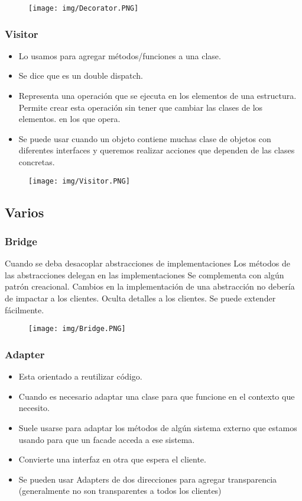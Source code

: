\begin{figure}[!htb]
    \centering
    \texttt{[image: img/Decorator.PNG]}
\end{figure}

\subsubsection*{Visitor}
\begin{itemize}
\item Lo usamos para agregar métodos/funciones a una clase.
\item Se dice que es un double dispatch.
\item Representa una operación que se ejecuta en los elementos de una estructura. Permite crear esta operación sin tener que cambiar las clases de los elementos. en los que opera.
\item Se puede usar cuando un objeto contiene muchas clase de objetos con diferentes interfaces y queremos realizar acciones que dependen de las clases concretas.
\end{itemize}


\begin{figure}[!htb]
    \centering
    \texttt{[image: img/Visitor.PNG]}
\end{figure}

\subsection*{Varios}

\subsubsection*{Bridge}
Cuando se deba desacoplar abstracciones de implementaciones
Los métodos de las abstracciones delegan en las implementaciones
Se complementa con algún patrón creacional.
Cambios en la implementación de una abstracción no debería de impactar a los clientes.
Oculta detalles a los clientes.
Se puede extender fácilmente.

\begin{figure}[!htb]
    \centering
    \texttt{[image: img/Bridge.PNG]}
\end{figure}

\subsubsection*{Adapter}
\begin{itemize}
\item Esta orientado a reutilizar código.
\item Cuando es necesario adaptar una clase para que funcione en el contexto que necesito.
\item Suele usarse para adaptar los métodos de algún sistema externo que estamos usando para que un facade acceda a ese sistema.
\item Convierte una interfaz en otra que espera el cliente.
\item Se pueden usar Adapters de dos direcciones para agregar transparencia (generalmente no son transparentes a todos los clientes)
\end{itemize}


